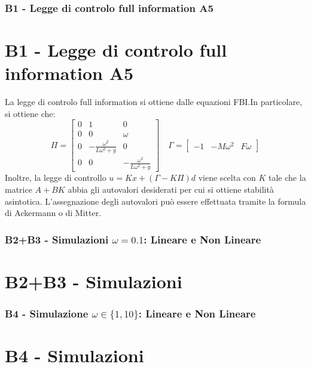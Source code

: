 \documentclass{beamer}
\begin{document}
\begin{frame}
	\frametitle{B1 - Legge di controlo full information A5}%
	\section{B1 - Legge di controlo full information A5}%
	La legge di controlo full information si ottiene dalle equazioni FBI.In particolare, si ottiene che:%
	\begin{equation*}
		\Pi=\begin{bmatrix}
			0&1&0\\0&0&\omega \\0&-\frac{\omega^{2}}{L\omega^{2}+g}&0\\0&0&-\frac{\omega^{3}}{L\omega^{2}+g}
		\end{bmatrix}\quad \Gamma=\begin{bmatrix}
			-1&-M\omega^{2}&F\omega
		\end{bmatrix}
	\end{equation*}
	Inoltre, la legge di controllo \(u=Kx+(\Gamma-K\Pi )d\) viene scelta con \(K\) tale che la matrice \(A+BK\) abbia gli autovalori desiderati per cui si ottiene stabilità asintotica. L'assegnazione degli autovalori può essere effettuata tramite la formula di Ackermann o di Mitter.
\end{frame}
\begin{frame}
	\frametitle{B2+B3 - Simulazioni \(\omega=0.1\): Lineare e Non Lineare}%
	\section{B2+B3 - Simulazioni}%
	

\end{frame}
\begin{frame}
	\frametitle{B4 - Simulazione \(\omega\in \{1,10\} \): Lineare e Non Lineare}%
	\section{B4 - Simulazioni}%
	

\end{frame}
\end{document}

